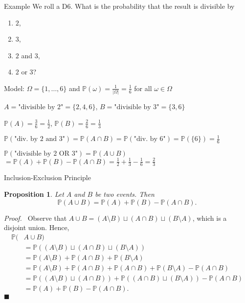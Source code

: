 \documentclass[11pt,pdf,ngerman,UKenglish,handout]{beamer}%
\newcommand{\IP}{\mathbb{P}}
\newcommand{\1}{\mathbb{1}}
\renewcommand{\qedsymbol}{$\blacksquare$}
\theoremstyle{thm}
\newtheorem{proposition}[theorem]{Proposition}
\theoremstyle{def}
\renewenvironment{proof}{\par\noindent\textit{Proof.~}}{\hfill \qedsymbol\newline}
\begin{document}
\begin{frame}{Example}
We roll a D6. What is the probability that the result is divisible by
\begin{enumerate}
\item $2$,
\item $3$,
\item $2$ and $3$,
\item $2$ or $3$?
\end{enumerate}
\vspace{2mm}
\pause
Model: $\Omega = \{ 1,\ldots,6 \}$ and $\IP(\omega) = \frac1{\vert \Omega \vert}= \frac16$ for all $\omega \in \Omega$

$A=\text{"divisible by 2"}=\{2,4,6\}$, \hfill $B=\text{"divisible by 3"}=\{3,6\}$

\pause
\vspace*{3mm}
$\IP(A) = \frac36=\frac12$, \hspace{1cm} $\IP(B)=\frac26=\frac13$

\pause
\vspace*{3mm}
$\IP(\text{"div.\ by 2 and 3"}) = \IP(A \cap B) = \IP(\text{"div.\ by 6"}) = \IP(\{ 6 \})= \frac16$

\pause
\vspace*{3mm}
$\IP(\text{"divisible by 2 OR 3"}) = \IP(A \cup B)$
\pause
\hspace*{1cm}$= \IP(A) + \IP(B) - \IP(A \cap B) = \frac12 + \frac13 - \frac16 = \frac23$
\vfill
\end{frame}


\begin{frame}{Inclusion-Exclusion Principle}
\begin{proposition}
Let $A$ and $B$ be two events. Then
$$\IP(A \cup B) = \IP(A) + \IP(B) - \IP(A \cap B).$$
\end{proposition}
\begin{proof}
Observe that $A \cup B = (A \setminus B) \sqcup (A \cap B) \sqcup (B \setminus A)$, which is a disjoint union. Hence,
\begin{align*}
\IP(&A \cup B) 
\\ 
&= \IP( (A \setminus B) \sqcup (A \cap B) \sqcup (B \setminus A) )
\\&
= \IP(A \setminus B) + \IP(A \cap B) + \IP(B \setminus A)
\\&
= \IP(A \setminus B) + \IP(A \cap B) + \IP(A \cap B) + \IP(B \setminus A) - \IP(A \cap B)
\\&
= \IP((A \setminus B) \sqcup (A \cap B) ) + \IP( (A \cap B) \sqcup (B \setminus A)) - \IP( A \cap B)
\\&
= \IP( A ) + \IP(B) - \IP( A \cap B).
\end{align*}
\end{proof}
\end{frame}
\end{document}

